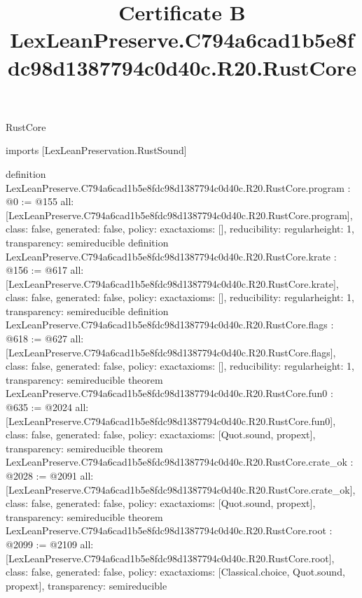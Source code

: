 \begin{lexlean}{RustCore}
\title{Certificate B LexLeanPreserve.C794a6cad1b5e8fdc98d1387794c0d40c.R20.RustCore}
\begin{coremodule}
imports [LexLeanPreservation.RustSound]

definition LexLeanPreserve.C794a6cad1b5e8fdc98d1387794c0d40c.R20.RustCore.program : @0 := @155 {
  all: [LexLeanPreserve.C794a6cad1b5e8fdc98d1387794c0d40c.R20.RustCore.program],
  class: false,
  generated: false,
  policy: exact{axioms: []},
  reducibility: regular{height: 1},
  transparency: semireducible
}
definition LexLeanPreserve.C794a6cad1b5e8fdc98d1387794c0d40c.R20.RustCore.krate : @156 := @617 {
  all: [LexLeanPreserve.C794a6cad1b5e8fdc98d1387794c0d40c.R20.RustCore.krate],
  class: false,
  generated: false,
  policy: exact{axioms: []},
  reducibility: regular{height: 1},
  transparency: semireducible
}
definition LexLeanPreserve.C794a6cad1b5e8fdc98d1387794c0d40c.R20.RustCore.flags : @618 := @627 {
  all: [LexLeanPreserve.C794a6cad1b5e8fdc98d1387794c0d40c.R20.RustCore.flags],
  class: false,
  generated: false,
  policy: exact{axioms: []},
  reducibility: regular{height: 1},
  transparency: semireducible
}
theorem LexLeanPreserve.C794a6cad1b5e8fdc98d1387794c0d40c.R20.RustCore.fun0 : @635 := @2024 {
  all: [LexLeanPreserve.C794a6cad1b5e8fdc98d1387794c0d40c.R20.RustCore.fun0],
  class: false,
  generated: false,
  policy: exact{axioms: [Quot.sound, propext]},
  transparency: semireducible
}
theorem LexLeanPreserve.C794a6cad1b5e8fdc98d1387794c0d40c.R20.RustCore.crate_ok : @2028 := @2091 {
  all: [LexLeanPreserve.C794a6cad1b5e8fdc98d1387794c0d40c.R20.RustCore.crate_ok],
  class: false,
  generated: false,
  policy: exact{axioms: [Quot.sound, propext]},
  transparency: semireducible
}
theorem LexLeanPreserve.C794a6cad1b5e8fdc98d1387794c0d40c.R20.RustCore.root : @2099 := @2109 {
  all: [LexLeanPreserve.C794a6cad1b5e8fdc98d1387794c0d40c.R20.RustCore.root],
  class: false,
  generated: false,
  policy: exact{axioms: [Classical.choice, Quot.sound, propext]},
  transparency: semireducible
}


\end{coremodule}
\end{lexlean}
